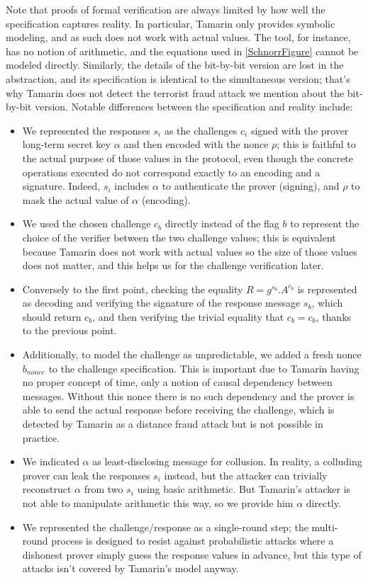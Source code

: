 Note that proofs of formal verification are always limited by how well the specification captures reality.
In particular, Tamarin only provides symbolic modeling, and as such does not work with actual values. The tool, for instance, has no notion of arithmetic, and the equations used in \cref{SchnorrFigure} cannot be modeled directly. Similarly, the details of the bit-by-bit version are lost in the abstraction, and its specification is identical to the simultaneous version; that's why Tamarin does not detect the terrorist fraud attack we mention about the bit-by-bit version.
Notable differences between the specification and reality include:
\begin{itemize}
	\item We represented the responses $s_i$ as the challenges $c_i$ signed with the prover long-term secret key $\alpha$ and then encoded with the nonce $\rho$; this is faithful to the actual purpose of those values in the protocol, even though the concrete operations executed do not correspond exactly to an encoding and a signature. Indeed, $s_i$ includes $\alpha$ to authenticate the prover (signing), and $\rho$ to mask the actual value of $\alpha$ (encoding).
	\item We used the chosen challenge $c_b$ directly instead of the flag $b$ to represent the choice of the verifier between the two challenge values; this is equivalent because Tamarin does not work with actual values so the size of those values does not matter, and this helps us for the challenge verification later.
	\item Conversely to the first point, checking the equality $R = g^{s_b}.A^{c_b}$ is represented as decoding and verifying the signature of the response message $s_b$, which should return $c_b$, and then verifying the trivial equality that $c_b = c_b$, thanks to the previous point.
	\item Additionally, to model the challenge as unpredictable, we added a fresh nonce $b_{nonce}$ to the challenge specification. This is important due to Tamarin having no proper concept of time, only a notion of causal dependency between messages. Without this nonce there is no such dependency and the prover is able to send the actual response before receiving the challenge, which is detected by Tamarin as a distance fraud attack but is not possible in practice.
	\item We indicated $\alpha$ as least-disclosing message for collusion. In reality, a colluding prover can leak the responses $s_i$ instead, but the attacker can trivially reconstruct $\alpha$ from two $s_i$ using basic arithmetic. But Tamarin's attacker is not able to manipulate arithmetic this way, so we provide him $\alpha$ directly.
	\item We represented the challenge/response as a single-round step; the multi-round process is designed to resist against probabilistic attacks where a dishonest prover simply guess the response values in advance, but this type of attacks isn't covered by Tamarin's model anyway.
\end{itemize}



